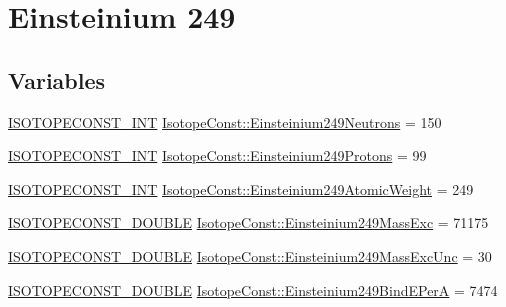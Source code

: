 \hypertarget{group___isotope_const-_einsteinium-_es249}{}\section{Einsteinium 249}
\label{group___isotope_const-_einsteinium-_es249}
\subsection*{Variables}
\begin{DoxyCompactItemize}
\item 
\mbox{\hyperlink{group___isotope_const-_macros_ga5f18360b3e99483a35c32d789e62621c}{I\+S\+O\+T\+O\+P\+E\+C\+O\+N\+S\+T\+\_\+\+I\+NT}} \mbox{\hyperlink{group___isotope_const-_einsteinium-_es249_ga0a1a92e88ce657aa4522095048f80a83}{Isotope\+Const\+::\+Einsteinium249\+Neutrons}} = 150
\item 
\mbox{\hyperlink{group___isotope_const-_macros_ga5f18360b3e99483a35c32d789e62621c}{I\+S\+O\+T\+O\+P\+E\+C\+O\+N\+S\+T\+\_\+\+I\+NT}} \mbox{\hyperlink{group___isotope_const-_einsteinium-_es249_ga1790ae6ca11fb33e1fe550e7a386f898}{Isotope\+Const\+::\+Einsteinium249\+Protons}} = 99
\item 
\mbox{\hyperlink{group___isotope_const-_macros_ga5f18360b3e99483a35c32d789e62621c}{I\+S\+O\+T\+O\+P\+E\+C\+O\+N\+S\+T\+\_\+\+I\+NT}} \mbox{\hyperlink{group___isotope_const-_einsteinium-_es249_ga9bdca0ad09f7857e34676f27e345884b}{Isotope\+Const\+::\+Einsteinium249\+Atomic\+Weight}} = 249
\item 
\mbox{\hyperlink{group___isotope_const-_macros_ga8f45a7272ce02c0b4c65c44636ed719a}{I\+S\+O\+T\+O\+P\+E\+C\+O\+N\+S\+T\+\_\+\+D\+O\+U\+B\+LE}} \mbox{\hyperlink{group___isotope_const-_einsteinium-_es249_ga130c57608347710b86ee18d0933de215}{Isotope\+Const\+::\+Einsteinium249\+Mass\+Exc}} = 71175
\item 
\mbox{\hyperlink{group___isotope_const-_macros_ga8f45a7272ce02c0b4c65c44636ed719a}{I\+S\+O\+T\+O\+P\+E\+C\+O\+N\+S\+T\+\_\+\+D\+O\+U\+B\+LE}} \mbox{\hyperlink{group___isotope_const-_einsteinium-_es249_gad09ae321e0359791729cbff74dbac73a}{Isotope\+Const\+::\+Einsteinium249\+Mass\+Exc\+Unc}} = 30
\item 
\mbox{\hyperlink{group___isotope_const-_macros_ga8f45a7272ce02c0b4c65c44636ed719a}{I\+S\+O\+T\+O\+P\+E\+C\+O\+N\+S\+T\+\_\+\+D\+O\+U\+B\+LE}} \mbox{\hyperlink{group___isotope_const-_einsteinium-_es249_gaea89c8f2cff600c454d901bbecb1e4e1}{Isotope\+Const\+::\+Einsteinium249\+Bind\+E\+PerA}} = 7474
\item 

\end{DoxyCompactItemize}
